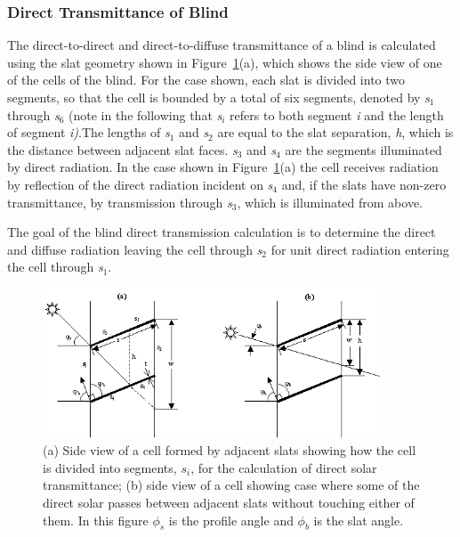 \subsubsection{Direct Transmittance of Blind}\label{direct-transmittance-of-blind}

The direct-to-direct and direct-to-diffuse transmittance of a blind is calculated using the slat geometry shown in Figure~\ref{fig:a-side-view-of-a-cell-formed-by-adjacent}(a), which shows the side view of one of the cells of the blind. For the case shown, each slat is divided into two segments, so that the cell is bounded by a total of six segments, denoted by \emph{s\(_{1}\)} through \emph{s\(_{6}\)} (note in the following that \emph{s\(_{i}\)} refers to both segment \emph{i} and the length of segment \emph{i)}.The lengths of \emph{s\(_{1}\)} and \emph{s\(_{2}\)} are equal to the slat separation, \emph{h}, which is the distance between adjacent slat faces. \emph{s\(_{3}\)} and \emph{s\(_{4}\)} are the segments illuminated by direct radiation. In the case shown in Figure~\ref{fig:a-side-view-of-a-cell-formed-by-adjacent}(a) the cell receives radiation by reflection of the direct radiation incident on \emph{s\(_{4}\)} and, if the slats have non-zero transmittance, by transmission through \emph{s\(_{3}\)}, which is illuminated from above.

The goal of the blind direct transmission calculation is to determine the direct and diffuse radiation leaving the cell through \emph{s\(_{2}\)} for unit direct radiation entering the cell through \emph{s\(_{1}\)}.

\begin{figure}[hbtp] %
\centering
\includegraphics[width=0.9\textwidth, height=0.9\textheight, keepaspectratio=true]{media/image1034.png}
\caption{(a) Side view of a cell formed by adjacent slats showing how the cell is divided into segments, \(s_i\),  for the calculation of direct solar transmittance; (b) side view of a cell showing case where some of the direct solar passes between adjacent slats without touching either of them. In this figure \(\phi_s\) is the profile angle and \(\phi_b\) is the slat angle. \label{fig:a-side-view-of-a-cell-formed-by-adjacent}}
\end{figure}

